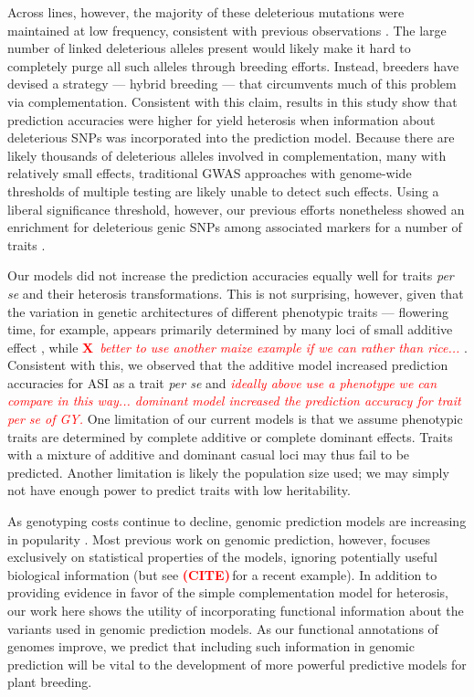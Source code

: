 \documentclass[9pt,twocolumn,twoside]{gsajnl}
\newcommand{\X}{\textcolor{red}{\bf X\,}}
\newcommand{\citex}{\textcolor{red}{\bf (CITE)\,}}
\newcommand{\jri}[1]{\textcolor{red}{ \emph{ #1}} }
\begin{document}
Across lines, however, the majority of these deleterious mutations were maintained at low frequency, consistent with previous observations \citep{rodgers2015recombination}. 
The large number of linked deleterious alleles present would likely make it hard to completely purge all such alleles through breeding efforts. Instead, breeders have devised a strategy --- hybrid breeding --- that circumvents much of this problem via complementation.
Consistent with this claim, results in this study show that prediction accuracies were higher for yield heterosis when information about deleterious SNPs was incorporated into the prediction model.  
Because there are likely thousands of deleterious alleles involved in complementation, many with relatively small effects, traditional GWAS approaches with genome-wide thresholds of multiple testing are likely unable to detect such effects.
Using a liberal significance threshold, however, our previous efforts nonetheless showed an enrichment for deleterious genic SNPs among associated markers for a number of traits \citep{Mezmouk2014}.

Our models did not increase the prediction accuracies equally well for traits \emph{per se} and their heterosis transformations. 
This is not surprising, however, given that the variation in genetic architectures of different phenotypic traits --- flowering time, for example, appears primarily determined by many loci of small additive effect \citep{buckler2009genetic}, while \X \jri{better to use another maize example if we can rather than rice...}. 
Consistent with this, we observed that the additive model increased prediction accuracies for ASI as a trait \emph{per se} and \jri{ideally above use a phenotype we can compare in this way... dominant model increased the prediction accuracy for trait \emph{per se} of GY.} 
One limitation of our current models is that we assume phenotypic traits are determined by complete additive or complete dominant effects. 
Traits with a mixture of additive and dominant casual loci may thus fail to be predicted. 
Another limitation is likely the population size used; we may simply not have enough power to predict traits with low heritability. 

As genotyping costs continue to decline, genomic prediction models are increasing in popularity \citep{desta2014genomic}. 
Most previous work on genomic prediction, however, focuses exclusively on statistical properties of the models, ignoring potentially useful biological information (but see \citex for a recent example). 
In addition to providing evidence in favor of the simple complementation model for heterosis, our work here shows the utility of incorporating functional information about the variants used in genomic prediction models.  
As our functional annotations of genomes improve, we predict that including such information in genomic prediction will be vital to the development of more powerful predictive models for plant breeding.
    
\end{document}
